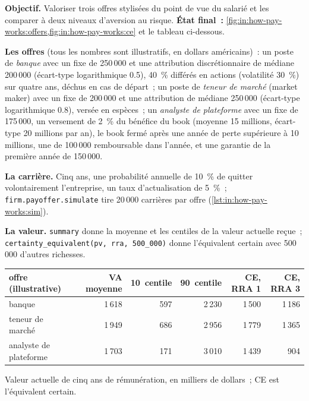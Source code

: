 \begin{tutorial}
\textbf{Objectif.} Valoriser trois offres stylisées du point de vue du salarié et les comparer à deux niveaux d'aversion au risque.
\textbf{État final~:} \cref{fig:in:how-pay-works:offers,fig:in:how-pay-works:ce} et le tableau ci-dessous.
\begin{tutsteps}
\item \textbf{Les offres} (tous les nombres sont illustratifs, en dollars américains)~: un poste de \emph{banque} avec un fixe de 250\,000 et une
attribution discrétionnaire de médiane 200\,000 (écart-type logarithmique 0.5), 40~\% différés en actions (volatilité 30~\%) sur quatre
ans, déchus en cas de départ~; un poste de \emph{teneur de marché} (market maker) avec un fixe de 200\,000 et une attribution de médiane 250\,000 (écart-type logarithmique
0.8), versée en espèces~; un \emph{analyste de plateforme} avec un fixe de 175\,000, un versement de 2~\% du bénéfice du book (moyenne
15 millions, écart-type 20 millions par an), le book fermé après une année de perte supérieure à 10 millions, une  de
100\,000 remboursable dans l'année, et une garantie de la première année de 150\,000.
\item \textbf{La carrière.} Cinq ans, une probabilité annuelle de 10~\% de quitter volontairement l'entreprise, un taux d'actualisation de 5~\%~;
\texttt{firm.payoffer.simulate} tire 20\,000 carrières par offre (\cref{lst:in:how-pay-works:sim}).
\label{lst:in:how-pay-works:sim}
\item \textbf{La valeur.} \texttt{summary} donne la moyenne et les centiles de la valeur actuelle reçue~;
\texttt{certainty\_equivalent(pv, rra, 500\_000)} donne l'équivalent certain avec 500\,000 d'autres richesses.
\end{tutsteps}
\end{tutorial}

\begin{center}\footnotesize
\begin{tabular}{@{}lrrrrr@{}}
\toprule
offre (illustrative) & VA moyenne & 10\up{e}~centile & 90\up{e}~centile & CE, RRA 1 & CE, RRA 3\\
\midrule
banque & 1\,618 & 597 & 2\,230 & 1\,500 & 1\,186\\
teneur de marché & 1\,949 & 686 & 2\,956 & 1\,779 & 1\,365\\
analyste de plateforme & 1\,703 & 171 & 3\,010 & 1\,439 & 904\\
\bottomrule
\end{tabular}

\smallskip Valeur actuelle de cinq ans de rémunération, en milliers de dollars~; CE est l'équivalent certain.
\end{center}

